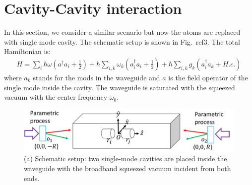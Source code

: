 \documentclass{article}
\begin{document}
\section{Cavity-Cavity interaction}
In this section, we consider a similar scenario but now the atoms are replaced with single mode cavity. The schematic setup is shown in Fig.~ref{3}. The total Hamiltonian is:
\begin{equation}
\label{eq5}
\begin{split}
H=\sum_{i}\hbar\omega(a^{\dagger}a_{i}+\frac{1}{2})+\hbar\sum_{i,k}\omega_{k}(a_{i}^{\dagger}a_{i}+\frac{1}{2})+\hbar\sum_{i,k}g_{k}(a_{i}^{\dagger}a_{k}+H.c.)
\end{split}
\end{equation}
where $a_k$ stands for the mods in the waveguide and $a$ is the field operator of the single mode inside the cavity. The waveguide is saturated with the squeezed vacuum with the center frequency $\omega_0$. 


\begin{figure}
\includegraphics[width=0.8\columnwidth]{fig3.png}
\caption{(a) Schematic setup: two single-mode cavities are placed inside the waveguide with the broadband squeezed vacuum incident from both ends.}
\label{3}
\end{figure}
\end{document}
